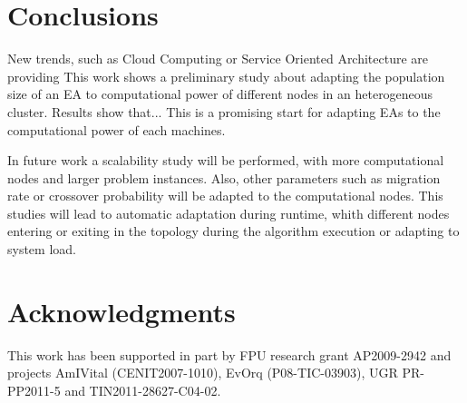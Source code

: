 \documentclass{sig-alternate}
\begin{document}
%



\section{Conclusions}
New trends, such as Cloud Computing or Service Oriented Architecture are providing  This work shows a preliminary study about adapting the population size of an EA to computational power of different nodes in an heterogeneous cluster. Results show that... This is a promising start for adapting EAs to the computational power of each machines.

In future work a scalability study will be performed, with more computational nodes and larger problem instances. Also, other parameters such as migration rate or crossover probability will be adapted to the computational nodes. This studies will lead to automatic adaptation during runtime, whith different nodes entering or exiting in the topology during the algorithm execution or adapting to system load.


\section{Acknowledgments}
This work has been supported in part by FPU research grant AP2009-2942 and projects AmIVital (CENIT2007-1010), EvOrq (P08-TIC-03903), UGR PR-PP2011-5 and TIN2011-28627-C04-02.

%



\end{document}
